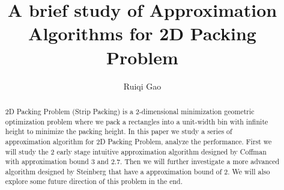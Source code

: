 \documentclass[sigplan,screen,nonacm]{acmart}\settopmatter{printfolios=true,printccs=false,printacmref=false}
\begin{document}
\sloppy

\title{A brief study of Approximation Algorithms for 2D Packing Problem}

\author{Ruiqi Gao}




\begin{abstract}
  2D Packing Problem (Strip Packing) is a 2-dimensional minimization geometric optimization problem where we pack a rectangles into a unit-width bin with infinite height to minimize the packing height. In this paper we study a series of approximation algorithm for 2D Packing Problem, analyze the performance. First we will study the 2 early stage intuitive approximation algorithm designed by Coffman with approximation bound 3 and 2.7. Then we will further investigate a more advanced algorithm designed by Steinberg that have a approximation bound of 2. We will also explore some future direction of this problem in the end.
\end{abstract}






\maketitle
\end{document}
